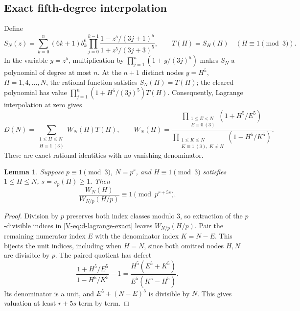 \documentclass[11pt,letterpaper]{article}
\newtheorem{lemma}[theorem]{Lemma}
\numberwithin{equation}{section}
\begin{document}
\subsection{Exact fifth-degree interpolation}
Define
\[
 S_N(z)=\sum_{k=0}^n(6k+1)b_k^6
 \prod_{j=0}^{k-1}\frac{1-z^5/(3j+1)^5}{1+z^5/(3j+3)^5},
 \qquad T(H)=S_H(H)\quad(H\equiv1\pmod3).
\]
In the variable $y=z^5$, multiplication by
$\prod_{j=1}^n(1+y/(3j)^5)$ makes $S_N$ a polynomial of degree at
most $n$. At the $n+1$ distinct nodes $y=H^5$,
$H=1,4,\ldots,N$, the rational function satisfies $S_N(H)=T(H)$;
the cleared polynomial has value $\prod_{j=1}^n(1+H^5/(3j)^5)T(H)$. Consequently,
Lagrange interpolation at zero gives
\begin{equation}\label{V-eq:d-lagrange-exact}
 D(N)=\sum_{\substack{1\le H\le N\\H\equiv1\ (3)}}W_N(H)T(H),
 \qquad
 W_N(H)=\frac{\prod_{\substack{1\le E<N\\E\equiv0\ (3)}}(1+H^5/E^5)}
 {\prod_{\substack{1\le K\le N\\K\equiv1\ (3),\ K\ne H}}(1-H^5/K^5)}.
\end{equation}
These are exact rational identities with no vanishing denominator.

\begin{lemma}\label{V-lem:d-weight-scale}
Suppose $p\equiv1\pmod3$, $N=p^r$, and $H\equiv1\pmod3$ satisfies
$1\le H\le N$, $s=v_p(H)\ge1$. Then
\[
 \frac{W_N(H)}{W_{N/p}(H/p)}\equiv1\pmod{p^{r+5s}}.
\]
\end{lemma}
\begin{proof}
Division by $p$ preserves both index classes modulo $3$, so extraction
of the $p$-divisible indices in \eqref{V-eq:d-lagrange-exact} leaves
$W_{N/p}(H/p)$. Pair the remaining numerator index $E$ with the
denominator index $K=N-E$. This bijects the unit indices, including
when $H=N$, since both omitted nodes $H,N$ are divisible by $p$.
The paired quotient has defect
\[
 \frac{1+H^5/E^5}{1-H^5/K^5}-1
 =\frac{H^5(E^5+K^5)}{E^5(K^5-H^5)}.
\]
Its denominator is a unit, and $E^5+(N-E)^5$ is divisible by $N$.
This gives valuation at least $r+5s$ term by term.
\end{proof}
\end{document}

